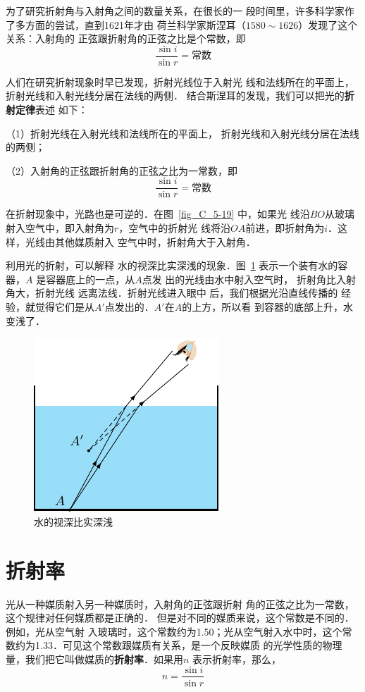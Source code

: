 为了研究折射角与入射角之间的数量关系，在很长的一
段时间里，许多科学家作了多方面的尝试，直到1621年才由
荷兰科学家斯涅耳（$1580 \sim 1626$）发现了这个关系：入射角的
正弦跟折射角的正弦之比是个常数，即
\[\frac{\sin i}{\sin r}=\text{常数}\]

人们在研究折射现象时早已发现，折射光线位于入射光
线和法线所在的平面上，折射光线和入射光线分居在法线的两侧．
结合斯涅耳的发现，我们可以把光的\textbf{折射定律}表述
如下：

（1）折射光线在入射光线和法线所在的平面上，
折射光线和入射光线分居在法线的两侧；

（2）入射角的正弦跟折射角的正弦之比为一常数，即
\[\frac{\sin i}{\sin r}=\text{常数}\]


在折射现象中，光路也是可逆的．在图~\ref{fig_C_5-19} 中，如果光
线沿$BO$从玻璃射入空气中，即入射角为$r$，空气中的折射光
线将沿$OA$前进，即折射角为$i$．这样，光线由其他媒质射入
空气中时，折射角大于入射角．

利用光的折射，可以解释
水的视深比实深浅的现象．图~\ref{fig_C_5-20} 表示一个装有水的容器，$A$
是容器底上的一点，从$A$点发
出的光线由水中射入空气时，
折射角比入射角大，折射光线
远离法线．折射光线进入眼中
后，我们根据光沿直线传播的
经验，就觉得它们是从$A'$点发出的．$A'$在$A$的上方，所以看
到容器的底部上升，水变浅了．
\begin{figure}[htbp]
    \centering
    \includegraphics{fig/C/5-20.pdf}
    \caption{水的视深比实深浅}\label{fig_C_5-20}
\end{figure}

\section{折射率} 
    光从一种媒质射入另一种媒质时，入射角的正弦跟折射
    角的正弦之比为一常数，这个规律对任何媒质都是正确的．
    但是对不同的媒质来说，这个常数是不同的．例如，光从空气射
    入玻璃时，这个常数约为1.50；光从空气射入水中时，这个常
    数约为1.33．可见这个常数跟媒质有关系，是一个反映媒质
    的光学性质的物理量，我们把它叫做媒质的\textbf{折射率}．如果用$n$
    表示折射率，那么，
    \[n=\frac{\sin i}{\sin r}\]

